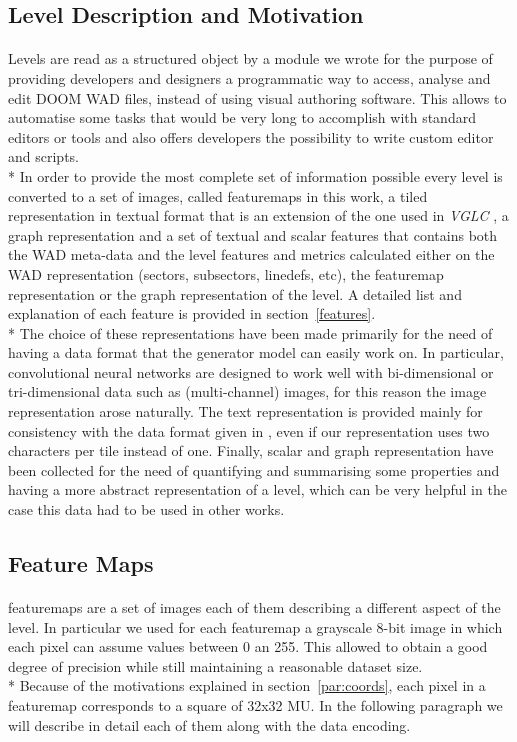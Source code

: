 \subsection{Level Description and Motivation}
\paragraph{}Levels are read as a structured object by a module we wrote for the purpose of providing developers and designers a programmatic way to access, analyse and edit DOOM WAD files, instead of using visual authoring software. This allows to automatise some tasks that would be very long to accomplish with standard editors or tools and also offers developers the possibility to write custom editor and scripts. \\*
In order to provide the most complete set of information possible every level is converted to a set of images, called \glspl{featuremap} in this work, a tiled representation in textual format that is an extension of the one used in \textit{VGLC} \cite{VGLC}, a graph representation and a set of textual and scalar features that contains both the \gls{WAD} meta-data and the level features and metrics calculated either on the WAD representation (sectors, subsectors, linedefs, etc), the \gls{featuremap} representation or the graph representation of the level. A detailed list and explanation of each feature is provided in section~\ref{features}. \\*
The choice of these representations have been made primarily for the need of having a data format that the generator model can easily work on. In particular, convolutional neural networks are designed to work well with bi-dimensional or tri-dimensional data such as (multi-channel) images, for this reason the image representation arose naturally. The text representation is provided mainly for consistency with the data format given in \cite{VGLC}, even if our representation uses two characters per tile instead of one. Finally, scalar and graph representation have been collected for the need of quantifying and summarising some properties and having a more abstract representation of a level, which can be very helpful in the case this data had to be used in other works.

\subsection{Feature Maps}
\paragraph{} \glspl{featuremap} are a set of images each of them describing a different aspect of the level. In particular we used for each \gls{featuremap} a grayscale 8-bit image in which each pixel can assume values between 0 an 255. This allowed to obtain a good degree of precision while still maintaining a reasonable dataset size. \\*
Because of the motivations explained in section~\ref{par:coords}, each pixel in a \gls{featuremap} corresponds to a square of 32x32 \gls{MU}. 
In the following paragraph we will describe in detail each of them along with the data encoding.

